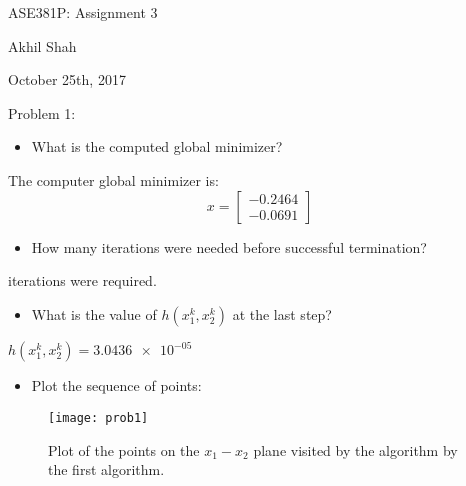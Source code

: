 \documentclass{article}
\begin{document}
\begin{center}
    {\huge ASE381P: Assignment 3}
\end{center}
\begin{center}
    Akhil Shah
\end{center}
\begin{center}
    October 25th, 2017
\end{center}

\noindent
{\large Problem 1:}
\begin{itemize}
	\item What is the computed global minimizer?
\end{itemize}
\qquad \qquad The computer global minimizer is:
\begin{equation*}
	x = \begin{bmatrix} -0.2464 \\ -0.0691 \end{bmatrix}
\end{equation*}
\begin{itemize}
	\item How many iterations were needed before successful termination?
\end{itemize}
\qquad {} iterations were required. 
\begin{itemize}
	\item What is the value of $h(x_1^k, x_2^k)$ at the last step?
\end{itemize}
\qquad \qquad $h(x_1^k, x_2^k) = \num{3.0436e-05}$
\begin{itemize}
	\item Plot the sequence of points:
\end{itemize}
\begin{figure}[H]
	\centering
	\texttt{[image: prob1]}
	\caption{Plot of the points on the $x_1 - x_2$ plane visited by the algorithm by the first algorithm.}
\end{figure}
\end{document}
